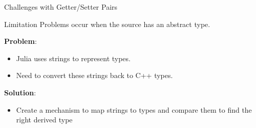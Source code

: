\begin{frame}{Challenges with Getter/Setter Pairs}
    \begin{block}{Limitation} 
        Problems occur when the source has an abstract type.
    \end{block}

    \textbf{Problem}:
    \begin{itemize}
        \item Julia uses strings to represent types.
        \item Need to convert these strings back to C++ types.
    \end{itemize}

    \textbf{Solution}:
    \begin{itemize}
        \item Create a mechanism to map strings to types and compare them to find the right derived type
    \end{itemize}
\end{frame}
